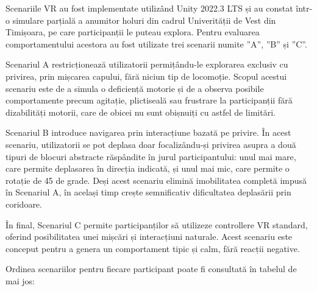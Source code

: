 \documentclass[12pt,a4paper]{report}
\theoremstyle{definition}
\theoremstyle{remark}
\begin{document}
Scenariile VR au fost implementate utilizând Unity 2022.3 LTS și au constat într-o simulare parțială a anumitor holuri din cadrul Univerității de Vest din Timișoara, pe care participanții le puteau explora. Pentru evaluarea comportamentului acestora au fost utilizate trei scenarii numite ”A”, ”B” și ”C”. 

Scenariul A restricționează utilizatorii permițându-le explorarea exclusiv cu privirea, prin mișcarea capului, fără niciun tip de locomoție. Scopul acestui scenariu este de a simula o deficiență motorie și de a observa posibile comportamente precum agitație, plictiseală sau frustrare la participanții fără dizabilități motorii, care de obicei nu sunt obișnuiți cu astfel de limitări.

Scenariul B introduce navigarea prin interacțiune bazată pe privire. În acest scenariu, utilizatorii se pot deplasa doar focalizându-și privirea asupra a două tipuri de blocuri abstracte răspândite în jurul participantului: unul mai mare, care permite deplasarea în direcția indicată, și unul mai mic, care permite o rotație de 45 de grade. Deși acest scenariu elimină imobilitatea completă impusă în Scenariul A, în același timp crește semnificativ dificultatea deplasării prin coridoare.

În final, Scenariul C permite participanților să utilizeze controllere VR standard, oferind posibilitatea unei mișcări și interacțiuni naturale. Acest scenariu este conceput pentru a genera un comportament tipic și calm, fără reacții negative. 

Ordinea scenariilor pentru fiecare participant poate fi consultată în tabelul de mai jos:
\end{document}
